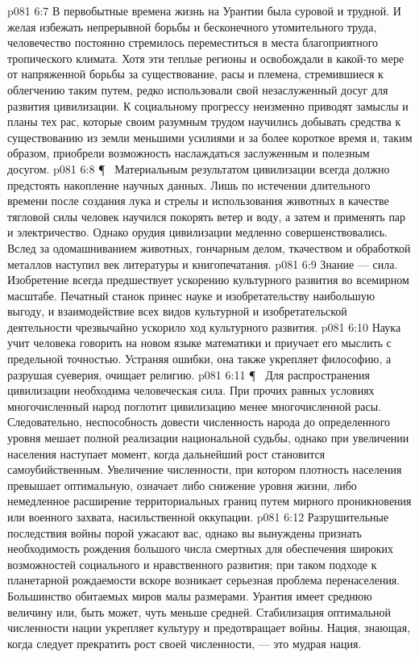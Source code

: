 \vs p081 6:7 В первобытные времена жизнь на Урантии была суровой и трудной. И желая избежать непрерывной борьбы и бесконечного утомительного труда, человечество постоянно стремилось переместиться в места благоприятного тропического климата. Хотя эти теплые регионы и освобождали в какой\hyp{}то мере от напряженной борьбы за существование, расы и племена, стремившиеся к облегчению таким путем, редко использовали свой незаслуженный досуг для развития цивилизации. К социальному прогрессу неизменно приводят замыслы и планы тех рас, которые своим разумным трудом научились добывать средства к существованию из земли меньшими усилиями и за более короткое время и, таким образом, приобрели возможность наслаждаться заслуженным и полезным досугом.
\vs p081 6:8 \P\  Материальным результатом цивилизации всегда должно предстоять накопление научных данных. Лишь по истечении длительного времени после создания лука и стрелы и использования животных в качестве тягловой силы человек научился покорять ветер и воду, а затем и применять пар и электричество. Однако орудия цивилизации медленно совершенствовались. Вслед за одомашниванием животных, гончарным делом, ткачеством и обработкой металлов наступил век литературы и книгопечатания.
\vs p081 6:9 Знание --- сила. Изобретение всегда предшествует ускорению культурного развития во всемирном масштабе. Печатный станок принес науке и изобретательству наибольшую выгоду, и взаимодействие всех видов культурной и изобретательской деятельности чрезвычайно ускорило ход культурного развития.
\vs p081 6:10 Наука учит человека говорить на новом языке математики и приучает его мыслить с предельной точностью. Устраняя ошибки, она также укрепляет философию, а разрушая суеверия, очищает религию.
\vs p081 6:11 \P\ \bibnobreakspace {} Для распространения цивилизации необходима человеческая сила. При прочих равных условиях многочисленный народ поглотит цивилизацию менее многочисленной расы. Следовательно, неспособность довести численность народа до определенного уровня мешает полной реализации национальной судьбы, однако при увеличении населения наступает момент, когда дальнейший рост становится самоубийственным. Увеличение численности, при котором плотность населения превышает оптимальную, означает либо снижение уровня жизни, либо немедленное расширение территориальных границ путем мирного проникновения или военного захвата, насильственной оккупации.
\vs p081 6:12 Разрушительные последствия войны порой ужасают вас, однако вы вынуждены признать необходимость рождения большого числа смертных для обеспечения широких возможностей социального и нравственного развития; при таком подходе к планетарной рождаемости вскоре возникает серьезная проблема перенаселения. Большинство обитаемых миров малы размерами. Урантия имеет среднюю величину или, быть может, чуть меньше средней. Стабилизация оптимальной численности нации укрепляет культуру и предотвращает войны. Нация, знающая, когда следует прекратить рост своей численности, --- это мудрая нация.
